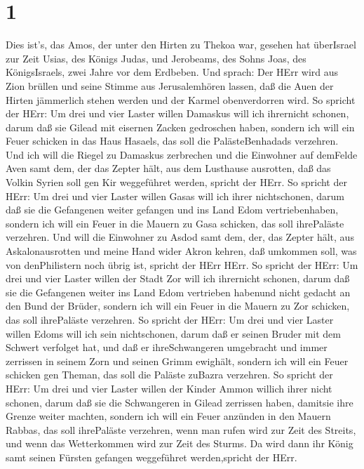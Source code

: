 \hypertarget{section}{%
\section{1}\label{section}}

 Dies ist's, das Amos, der unter den Hirten zu Thekoa war,
gesehen hat überIsrael zur Zeit Usias, des Königs Judas, und Jerobeams,
des Sohns Joas, des KönigsIsraels, zwei Jahre vor dem Erdbeben.
 Und sprach: Der HErr wird aus Zion brüllen und seine Stimme
aus Jerusalemhören lassen, daß die Auen der Hirten jämmerlich stehen
werden und der Karmel obenverdorren wird.  So spricht der
HErr: Um drei und vier Laster willen Damaskus will ich ihrernicht
schonen, darum daß sie Gilead mit eisernen Zacken gedroschen haben,
 sondern ich will ein Feuer schicken in das Haus Hasaels,
das soll die PalästeBenhadads verzehren.  Und ich will die
Riegel zu Damaskus zerbrechen und die Einwohner auf demFelde Aven samt
dem, der das Zepter hält, aus dem Lusthause ausrotten, daß das Volkin
Syrien soll gen Kir weggeführet werden, spricht der HErr. 
So spricht der HErr: Um drei und vier Laster willen Gasas will ich ihrer
nichtschonen, darum daß sie die Gefangenen weiter gefangen und ins Land
Edom vertriebenhaben,  sondern ich will ein Feuer in die
Mauern zu Gasa schicken, das soll ihrePaläste verzehren. 
Und will die Einwohner zu Asdod samt dem, der, das Zepter hält, aus
Askalonausrotten und meine Hand wider Akron kehren, daß umkommen soll,
was von denPhilistern noch übrig ist, spricht der HErr HErr.
 So spricht der HErr: Um drei und vier Laster willen der
Stadt Zor will ich ihrernicht schonen, darum daß sie die Gefangenen
weiter ins Land Edom vertrieben habenund nicht gedacht an den Bund der
Brüder,  sondern ich will ein Feuer in die Mauern zu Zor
schicken, das soll ihrePaläste verzehren.  So spricht der
HErr: Um drei und vier Laster willen Edoms will ich sein nichtschonen,
darum daß er seinen Bruder mit dem Schwert verfolget hat, und daß er
ihreSchwangeren umgebracht und immer zerrissen in seinem Zorn und seinen
Grimm ewighält,  sondern ich will ein Feuer schicken gen
Theman, das soll die Paläste zuBazra verzehren.  So spricht
der HErr: Um drei und vier Laster willen der Kinder Ammon willich ihrer
nicht schonen, darum daß sie die Schwangeren in Gilead zerrissen haben,
damitsie ihre Grenze weiter machten,  sondern ich will ein
Feuer anzünden in den Mauern Rabbas, das soll ihrePaläste verzehren,
wenn man rufen wird zur Zeit des Streits, und wenn das Wetterkommen wird
zur Zeit des Sturms.  Da wird dann ihr König samt seinen
Fürsten gefangen weggeführet werden,spricht der HErr.

